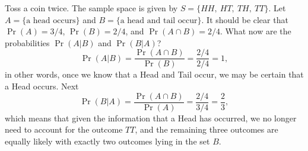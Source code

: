 \documentclass[captions=tableheading]{scrbook}
\begin{document}
\begin{example}
Toss a coin twice. The sample space is given by \(S=\{ HH,\ HT,\ TH,\ TT \} \). Let \(A= \{ \mbox{a head occurs} \} \) and \(B= \{ \mbox{a head and tail occur} \} \). It should be clear that \(\Pr(A)=3/4\), \(\Pr(B)=2/4\), and \(\Pr(A\cap B)=2/4\). What now are the probabilities \(\Pr(A|B)\) and \(\Pr(B|A)\)?
\[
\Pr(A|B)=\frac{\Pr(A\cap B)}{\Pr(B)}=\frac{2/4}{2/4}=1,
\]
in other words, once we know that a Head and Tail occur, we may be certain that a Head occurs. Next
\[
\Pr(B|A)=\frac{\Pr(A\cap B)}{\Pr(A)}=\frac{2/4}{3/4}=\frac{2}{3},
\]
which means that given the information that a Head has occurred, we no longer need to account for the outcome \(TT\), and the remaining three outcomes are equally likely with exactly two outcomes lying in the set \(B\). 
\end{example}
\end{document}
